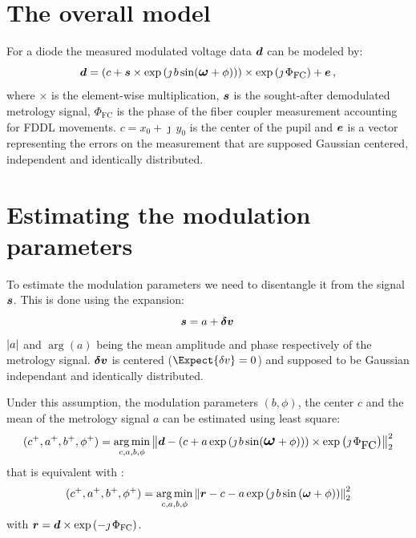 \documentclass[a4paper,11pt,twoside]{scrartcl}
\begin{document}
\section{The overall model}
For a  diode the measured modulated voltage data $\boldsymbol{d}$ can be modeled by:
\begin{equation}
    \boldsymbol{d} = \left( c + \boldsymbol{s} \times  \exp\left( \jmath \, b \sin\large( \boldsymbol{\omega} + \phi\large)\right)\right)\times\exp\left(\jmath\,\Phi_\textrm{FC}\right)+  \boldsymbol{e}\,,\label{eq:model}
\end{equation}
where $\times$ is the element-wise multiplication, $\boldsymbol{s}$ is the sought-after demodulated  metrology signal, $\Phi_\textrm{FC}$ is the phase of the fiber coupler measurement accounting for FDDL movements. $c  = x_0 + \jmath\,y_0$ is the center of the pupil and $\boldsymbol{e}$ is a vector representing the errors on the measurement that are supposed Gaussian centered, independent and identically distributed.



\section{ Estimating the modulation parameters}

To estimate the modulation parameters we need to disentangle it from the signal  $\boldsymbol{s}$. This is done using the expansion:
\begin{equation}
    \boldsymbol{s} = a  + \boldsymbol{\delta v}\,
\end{equation}
$\vert a\vert$  and $\arg{(a)}$ being the  mean amplitude and phase respectively of the metrology signal.  $ \boldsymbol{\delta v}$ is centered ($\Expect{\delta v}= 0$)  and supposed to be Gaussian independant and identically distributed.

Under this assumption, the modulation parameters $( b, \phi)$, the center $c$ and the mean of the metrology signal $a$ can be estimated using least square:
\begin{equation}
    (c^+, a^+, b^+, \phi^+) = \argmin_{c,a,b,\phi} \Norm{\V{d} -  \left(c + a \exp\left( \jmath \, b \sin\Large( \V{\omega} + \phi\right)\Large)\right)\times\exp\left(\jmath\,\Phi_\textrm{FC}\right) }_2^2
\end{equation}
that is equivalent with : 
\begin{equation}
    (c^+, a^+, b^+, \phi^+) = \argmin_{c,a,b,\phi} \Norm{\V{r} -  c - a \exp\left( \jmath \, b \sin\left( \V{\omega} + \phi\right)\right) }_2^2\label{eq:r}
\end{equation}
with $\boldsymbol{r} =\boldsymbol{d}\times\exp\left(-\jmath\,\Phi_\textrm{FC}\right)$.
\end{document}
